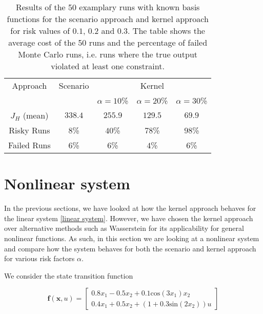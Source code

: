 \begin{table}
\centering
\begin{tabular}{|c| c| c| c| c|}
\hline
Approach & Scenario &  \multicolumn{3}{|c|}{Kernel}\\  \cline{3-5} & &  $\alpha = 10$\% & $\alpha = 20$\% & $\alpha = 30$\% \\
\hline
$J_H$ (mean) & $338.4$ & $255.9$ & $129.5$ & $69.9$\\
\hline
Risky Runs & $8$\% & $40$\% & $78$\% & $98$\% \\
\hline
Failed Runs & $6$\% & $6$\% & $4$\% & $6$\% \\
\hline
\end{tabular}
\caption{Results of the 50 examplary runs with known basis functions for the scenario approach and kernel approach for risk values of $0.1$, $0.2$ and $0.3$. The table shows the average cost of the 50 runs and the percentage of failed Monte Carlo runs, i.e. runs where the true output violated at least one constraint.}
\label{tab:results_corridor}
\end{table} 


\section{Nonlinear system} \label{Nonlinear system}

In the previous sections, we have looked at how the kernel approach behaves for the linear system \eqref{linear system}. However, we have chosen the kernel approach over alternative methods such as Wasserstein for its applicability for general nonlinear functions. As such, in this section we are looking at a nonlinear system and compare how the system behaves for both the scenario and kernel approach for various risk factors $\alpha$.

We consider the state transition function

\begin{equation} \label{nonlinear system}
\boldsymbol{f}(\boldsymbol{x}, u) = 
\begin{bmatrix}
0.8  x_1 - 0.5 x_2 + 0.1 \text{cos} ( 3 x_1) x_2 \\
0.4 x_1 + 0.5 x_2 + (1 + 0.3 \text{sin} (2 x_2)) u
\end{bmatrix}
\end{equation}

